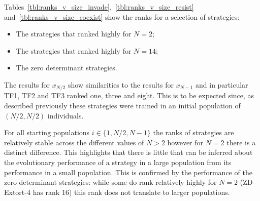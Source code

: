 \documentclass[10pt,letterpaper]{article}
\begin{document}
Tables~\ref{tbl:ranks_v_size_invade},~\ref{tbl:ranks_v_size_resist}
and~\ref{tbl:ranks_v_size_coexist} show the ranks for a selection of
strategies:

\begin{itemize}
    \item The strategies that ranked highly for \(N=2\);
    \item The strategies that ranked highly for \(N=14\);
    \item The zero determinant strategies.
\end{itemize}

The results for \(x_{N/2}\) show similarities to the results for \(x_{N-1}\) and
in particular TF1, TF2 and TF3 ranked one, three and eight. This is to be
expected since, as described previously these strategies
were trained in an initial population of \((N/2, N/2)\) individuals.

For all starting populations
\(i\in\{1, N/2, N-1\}\) the ranks of strategies are relatively stable across the
different values of \(N>2\) however for \(N=2\) there is a distinct difference.
This highlights that there is little that can be inferred about the evolutionary
performance of a strategy in a large population from its performance in a small
population. This is confirmed by the performance of the zero determinant strategies: while
some do rank relatively highly for \(N=2\) (ZD-Extort-4 has rank 16) this rank
does not translate to larger populations.
\end{document}
